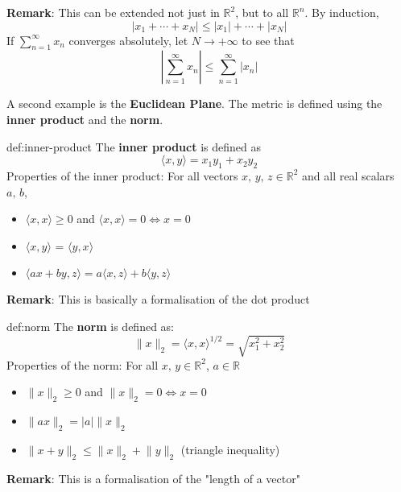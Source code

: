 \documentclass{article}
\begin{document}
\textbf{Remark}: This can be extended not just in $\mathbb{R}^{2}$, but to all $\mathbb{R}^{n}$. By induction,
\[\lvert x_{1} + \cdots + x_{N} \rvert \le \lvert x_{1} \rvert + \cdots + \lvert x_{N} \rvert\]
If $\displaystyle\sum_{n = 1}^{\infty}x_{n}$ converges absolutely, let $N\to +\infty$ to see that
\[\left\lvert \sum_{n = 1}^{\infty}x_{n} \right\rvert \le \sum_{n = 1}^{\infty} \lvert x_{n} \rvert\]




\newpage
A second example is the \textbf{Euclidean Plane}. The metric is defined using the \textbf{inner product} and the \textbf{norm}.

\begin{dfn}{def:inner-product}{}
    The \textbf{inner product} is defined as
    \[\langle x,y \rangle = x_{1}y_{1} + x_{2}y_{2}\]
    Properties of the inner product:
    For all vectors $x,\,y,\,z\in \mathbb{R}^{2}$ and all real scalars $a,\,b$,
    \begin{itemize}
        \item $\langle x,x \rangle\ge 0$ and $\langle x,x \rangle = 0 \iff x = 0$
        \item $\langle x,y \rangle$ = $\langle y,x \rangle$
        \item $\langle ax+by,z \rangle = a\langle x,z \rangle + b\langle y,z \rangle$
    \end{itemize}
\end{dfn}

\textbf{Remark}: This is basically a formalisation of the dot product

\begin{dfn}[Norm]{def:norm}{}
    The \textbf{norm} is defined as:
    \[\lVert x \rVert_{2} = \langle x,x \rangle^{1/2} = \sqrt{x^{2}_{1} + x^{2}_{2}}\]
    Properties of the norm: For all $x,\,y\in\mathbb{R}^{2}$, $a\in\mathbb{R}$
    \begin{itemize}
        \item $\lVert x \rVert_{2} \ge 0$ and $\lVert x \rVert_{2} = 0 \iff x = 0$
        \item $\lVert ax \rVert_{2} = \lvert a \rvert\lVert x \rVert_{2}$
        \item $\lVert x+y \rVert_{2} \le \lVert x \rVert_{2}+\lVert y \rVert_{2}$ (triangle inequality)
    \end{itemize}
\end{dfn}
\textbf{Remark}: This is a formalisation of the "length of a vector"
\end{document}
